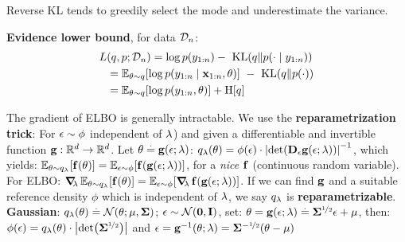 Reverse KL tends to greedily select the mode and underestimate the variance.
\begin{framed}
    \textbf{Evidence lower bound}, for data $\mathcal{D}_n$:\\
    \begin{align*}
        L&(q, p; \spD_n) = \log p(y_{1:n}) -\ \KL{q}{p(\cdot \mid y_{1:n})} \\
        &= \E[\vtheta \sim q]{\log p(y_{1:n} \mid \vx_{1:n}, \vtheta)}\ -\ \KL{q}{p(\cdot)}\\
        &= \mathbb{E}_{\vtheta\sim q}[\log p(y_{1:n},\theta)]+\H{q}
    \end{align*}
\end{framed}
The gradient of ELBO is generally intractable. We use the \textbf{reparametrization trick}: For $\mathbf{\epsilon} \sim \phi$ independent of $\mathbf{\lambda}$) and given a differentiable and invertible function $\mathbf{g} : \mathbb{R}^d \to \mathbb{R}^d$. Let $\mathbf{\theta} \overset{.}{=} \mathbf{g}(\mathbf{\epsilon}; \mathbf{\lambda})$: $q_\vlambda(\vtheta) = \phi(\vepsilon) \cdot \inv{\abs{\det{\jac_\vepsilon \vg(\vepsilon; \vlambda)}}}$, which yields: $\E[\vtheta \sim q_\vlambda]{\vf(\vtheta)} = \E[\vepsilon \sim \phi]{\vf(\vg(\vepsilon; \vlambda))}$, for a \textit{nice} $\mathbf{f}$ (continuous random variable). \\
For ELBO: $\grad_\vlambda \E[\vtheta \sim q_\vlambda]{\vf(\vtheta)} = \E[\vepsilon \sim \phi]{\grad_\vlambda \vf(\vg(\vepsilon; \vlambda))}$. If we can find $\mathbf{g}$ and a suitable reference density $\phi$ which is independent of $\mathbf{\lambda}$, we say $q_{\mathbf{\lambda}}$ is \textbf{reparametrizable}. \\
\textbf{Gaussian}: $q_\vlambda(\vtheta) \defeq \N[\vtheta]{\vmu}{\mSigma}$; ${\vepsilon \sim \SN}$, set: $\mathbf{\theta} = \mathbf{g}(\mathbf{\epsilon}; \mathbf{\lambda}) \overset{.}{=} \mathbf{\Sigma}^{\nicefrac{1}{2}} \mathbf{\epsilon} + \mathbf{\mu}$, then: $\phi(\vepsilon) = q_\vlambda(\vtheta) \cdot \abs{\det{\msqrt{\mSigma}}}$ and $\mathbf{\epsilon} = \mathbf{g}^{-1}(\mathbf{\theta}; \mathbf{\lambda}) = \mathbf{\Sigma}^{-\nicefrac{1}{2}}(\mathbf{\theta} - \mathbf{\mu})$
